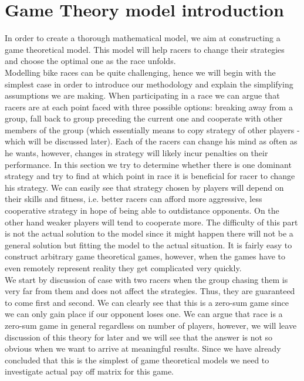 \documentclass[10pt, a4paper]{report}
\begin{document}

\section{Game Theory model introduction}

In order to create a thorough mathematical model, we aim at constructing a game theoretical model. This model will help racers to change their strategies and choose the optimal one as the race unfolds.\\

Modelling bike races can be quite challenging, hence we will begin with the simplest case in order to introduce our methodology and explain the simplifying assumptions we are making. When participating in a race we can argue that racers are at each point faced with three possible options: breaking away from a group, fall back to group preceding the current one and cooperate with other members of the group (which essentially means to copy strategy of other players - which will be discussed later). Each of the racers can change his mind as often as he wants, however, changes in strategy will likely incur penalties on their performance. In this section we try to determine whether there is one dominant strategy and try to find at which point in race it is beneficial for racer to change his strategy. We can easily see that strategy chosen by players will depend on their skills and fitness, i.e. better racers can afford more aggressive, less cooperative strategy in hope of being able to outdistance opponents. On the other hand weaker players will tend to cooperate more. The difficulty of this part is not the actual solution to the model since it might happen there will not be a general solution but fitting the model to the actual situation. It is fairly easy to construct arbitrary game theoretical games, however, when the games have to even remotely represent reality they get complicated very quickly.\\

We start by discussion of case with two racers when the group chasing them is very far from them and does not affect the strategies. Thus, they are guaranteed to come first and second. We can clearly see that this is a zero-sum game since we can only gain place if our opponent loses one. We can argue that race is a zero-sum game in general regardless on number of players, however, we will leave discussion of this theory for later and we will see that the answer is not so obvious when we want to arrive at meaningful results. Since we have already concluded that this is the simplest of game theoretical models we need to investigate actual pay off matrix for this game. \\
\end{document}

